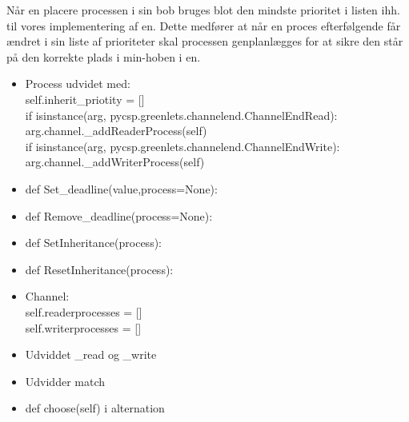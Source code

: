 Når \sched en placere processen i sin bob bruges blot den mindste prioritet i listen ihh. til vores implementering af \sched en. Dette medfører  at når en proces efterfølgende  får ændret i sin liste af prioriteter skal processen genplanlægges for at sikre den står på den korrekte plads i min-hoben i \sched en. 

\begin{itemize}
\tightlist
\item Process udvidet med: \\self.inherit\_priotity = []     \\
            if isinstance(arg, pycsp.greenlets.channelend.ChannelEndRead):\\
                arg.channel.\_addReaderProcess(self)\\
            if isinstance(arg, pycsp.greenlets.channelend.ChannelEndWrite):\\
                arg.channel.\_addWriterProcess(self)
\item def Set\_deadline(value,process=None):
\item def Remove\_deadline(process=None):
\item def SetInheritance(process):
\item def ResetInheritance(process):
\item Channel:\\
        self.readerprocesses = []\\
        self.writerprocesses = []

\item Udviddet \_read og \_write
\item Udvidder match
\item     def choose(self) i alternation


\end{itemize}
